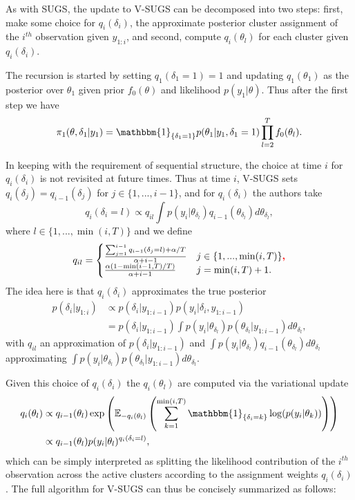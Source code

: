 \documentclass{uwstat572}
\newcommand{\vmadd}[1]{\textbf{\color{red}{#1}}}
\begin{document}
As with SUGS, the update to V-SUGS can be decomposed into two steps: first, make some choice for $q_i(\delta_i)$, the approximate posterior cluster assignment of the $i^{th}$ observation given $y_{1:i}$, and second, compute $q_i(\theta_l)$ for each cluster given $q_i(\delta_i)$. 

The recursion is started by setting $q_1(\delta_1 = 1) = 1$ and updating $q_1(\theta_1)$ as the posterior over $\theta_1$ given prior $f_0(\theta)$ and likelihood $p(y_1 |\theta)$. Thus after the first step we have
$$ \pi_1(\theta,\delta_1 | y_1) = \mathbbm{1}_{\{\delta_1 = 1\}} p(\theta_1 | y_1,\delta_1 = 1)\prod_{l=2}^T f_0(\theta_l).$$

In keeping with the requirement of sequential structure, the choice at time $i$ for $q_i(\delta_i)$ is not revisited at future times. Thus at time $i$, V-SUGS sets $q_i(\delta_j) = q_{i-1}(\delta_j)$ for $j \in \{1,...,i-1\}$, and for $q_i(\delta_i)$ the authors take
$$ q_i(\delta_i = l) \propto q_{il} \int p(y_i | \theta_{\delta_l}) q_{i-1}(\theta_{\delta_l}) d\theta_{\delta_l},$$
where $l \in \{1,..., \min(i,T)\}$ and we define
\[ q_{il} = \begin{cases} 
      \frac{\sum_{j=1}^{i-1} q_{i-1}(\delta_j = l)+\alpha/T}{\alpha+i-1}& j \in \{1,...,\min(i,T)\}\vmadd{,} \\
      \frac{\alpha(1-\min(i-1,T)/T)}{\alpha+i-1} & j = \min(i,T) +1.
   \end{cases}
\]
The idea here is that $q_i(\delta_i)$ approximates the true posterior
\begin{align}
p(\delta_i | y_{1:i}) &\propto p(\delta_i | y_{1:i-1})p(y_i | \delta_i,y_{1:i-1}) \nonumber \\
&= p(\delta_i | y_{1:i-1}) \int p(y_i | \theta_{\delta_l}) p(\theta_{\delta_l}|y_{1:i-1}) d\theta_{\delta_l}, \nonumber
\end{align}
with $q_{il}$ an approximation of $p(\delta_i | y_{1:i-1})$ and $ \int p(y_i | \theta_{\delta_l}) q_{i-1}(\theta_{\delta_l}) d\theta_{\delta_l}$ approximating $\int p(y_i | \theta_{\delta_l}) p(\theta_{\delta_l}|y_{1:i-1}) d\theta_{\delta_l}$. 

Given this choice of $q_i(\delta_i)$ the $q_i(\theta_l)$ are computed via the variational update
\begin{align}
q_i(\theta_l) &\propto q_{i-1}(\theta_l) \exp \left( \mathbb{E}_{-q_i(\theta_l)} \left( \sum_{k=1}^{\min(i,T)} \mathbbm{1}_{\{\delta_i = k\}} \log(p(y_i | \theta_k))\right)\right) \nonumber \\
&\propto q_{i-1}(\theta_l)p(y_i | \theta_l)^{q_i(\delta_i=l)}, \nonumber
\end{align}
which can be simply interpreted as splitting the likelihood contribution of the $i^{th}$ observation across the active clusters according to the assignment weights $q_i(\delta_i)$. The full algorithm for V-SUGS can thus be concisely summarized as follows:
\medskip
\end{document}
